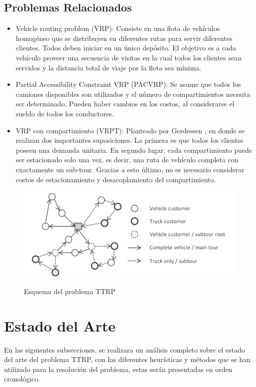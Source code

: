 \documentclass[letter, 10pt]{article}
\begin{document}
\subsection{Problemas Relacionados}
\begin{itemize}
    \item Vehicle routing problem (VRP): Consiste en una flota de vehículos homogéneo que se distribuyen en diferentes rutas para servir diferentes clientes. Todos deben iniciar en un único depósito. El objetivo es a cada vehículo proveer una secuencia de visitas en la cual todos los clientes sean servidos y la distancia total de viaje por la flota sea mínima. 
    \item Partial Accessibility Constraint VRP (PACVRP): Se asume que todos los camiones disponibles son utilizados y el número de compartimientos necesita ser determinado. Pueden haber cambios en los costos, al considerarse el sueldo de todos los conductores.
    \item VRP con compartimiento (VRPT): Planteado por Gerdessen \cite{Gerdessen}, en donde se realizan dos importantes suposiciones. La primera es que todos los clientes poseen una demanda unitaria. En segundo lugar, cada compartimiento puede ser estacionado solo una vez, es decir, una ruta de vehículo completa con exactamente un sub-tour. Gracias a esto último, no es necesario considerar costos de estacionamiento y desacoplamiento del compartimiento.
\end{itemize}
\begin{figure}[h]
    \centering
    \caption{Esquema del problema TTRP}
    \vspace{0.5cm}
    \includegraphics[scale=0.8]{Images/Tipos.png}
    \label{fig:Tipos}
\end{figure} 

\section{Estado del Arte}
En las siguientes subsecciones, se realizara un análisis completo sobre el estado del arte del problema TTRP, con las diferentes heurísticas y métodos que se han utilizado para la resolución del problema, estas serán presentadas en orden cronológico. 
\end{document}
